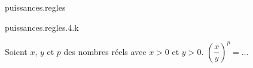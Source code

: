 \begin{qcm}{puissances.regles}
  \begin{question}{puissances.regles.4.k}
    {Soient \(x\), \(y\) et \(p\) des nombres réels avec \(x>0\) et \(y>0\). \(\left(\dfrac{x}{y}\right)^p=\ldots\)
      \begin{multicols}{2}
        \begin{reponses}
          \lastchoices
        \end{reponses}
      \end{multicols}}
  \end{question}
\end{qcm}

